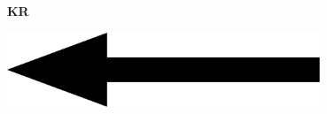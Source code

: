 \documentclass[a4paper]{article}
\begin{document}
\printGenericVSLHeader
\begin{center}
\begin{vsltext}{4cm}{4.5cm}

   \vspace{0.5cm} 

    \textbf{KR} 

    \vspace{2.5cm}

    \includegraphics[width=0.7\textwidth, keepaspectratio=true]{arrow_left.pdf}

\end{vsltext}

\end{center}
\end{document}
